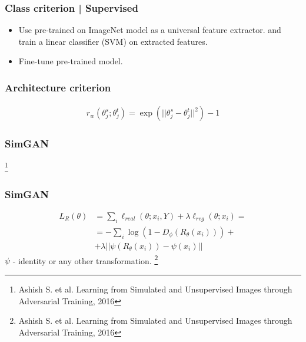 \documentclass[14pt,aspectratio=169]{beamer}
\newcommand\blfootnote[1]{%
  \begingroup
  \renewcommand\thefootnote{}\footnote{#1}%
  \addtocounter{footnote}{-1}%
  \endgroup
}
\begin{document}
\begin{frame}
\frametitle{Class criterion | Supervised}
\begin{itemize}
  \item Use pre-trained on ImageNet model as a universal feature extractor.
  and train a linear classifier (SVM) on extracted features.
  \item Fine-tune pre-trained model.
\end{itemize}
\end{frame}

\begin{frame}
\frametitle{Architecture criterion}
\begin{align*}
  r_w(\theta_j^s; \theta_j^t) = \exp\left(||\theta_j^s - \theta_j^t||^2\right) - 1
\end{align*}
\end{frame}

\begin{frame}
\frametitle{SimGAN}
\blfootnote{Ashish S. et al. Learning from Simulated and Unsupervised Images through Adversarial
Training, 2016}
\end{frame}

\begin{frame}
\frametitle{SimGAN}
\begin{align*}
  L_R(\theta) &= \sum_i \ell_{real}(\theta; x_i, Y) + \lambda \ell_{reg}(\theta; x_i) = \\
  &= - \sum_i \log(1 - D_{\phi}(R_{\theta}(x_i))) + \\
  &+\lambda ||\psi(R_{\theta}(x_i)) - \psi(x_i)||
\end{align*}
$\psi$ - identity or any other transformation.
\blfootnote{Ashish S. et al. Learning from Simulated and Unsupervised Images through Adversarial
Training, 2016}
\end{frame}
\end{document}
